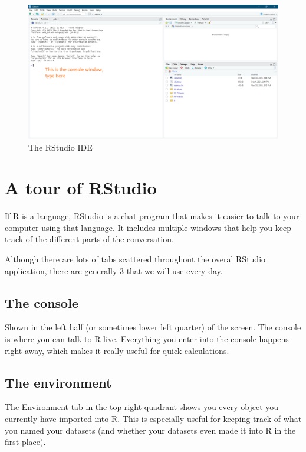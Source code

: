 \documentclass[
]{book}
\begin{document}
\begin{figure}

{\centering \includegraphics[width=0.8\linewidth]{images/package_install_instructions} 

}

\caption{The RStudio IDE}\label{fig:unnamed-chunk-4}
\end{figure}

\hypertarget{a-tour-of-rstudio}{%
\section{A tour of RStudio}\label{a-tour-of-rstudio}}

If R is a language, RStudio is a chat program that makes it easier to talk to your computer using that language. It includes multiple windows that help you keep track of the different parts of the conversation.

Although there are lots of tabs scattered throughout the overal RStudio application, there are generally 3 that we will use every day.

\hypertarget{the-console}{%
\subsection{The console}\label{the-console}}

Shown in the left half (or sometimes lower left quarter) of the screen. The console is where you can talk to R live. Everything you enter into the console happens right away, which makes it really useful for quick calculations.

\hypertarget{the-environment}{%
\subsection{The environment}\label{the-environment}}

The Environment tab in the top right quadrant shows you every object you currently have imported into R. This is especially useful for keeping track of what you named your datasets (and whether your datasets even made it into R in the first place).
\end{document}
